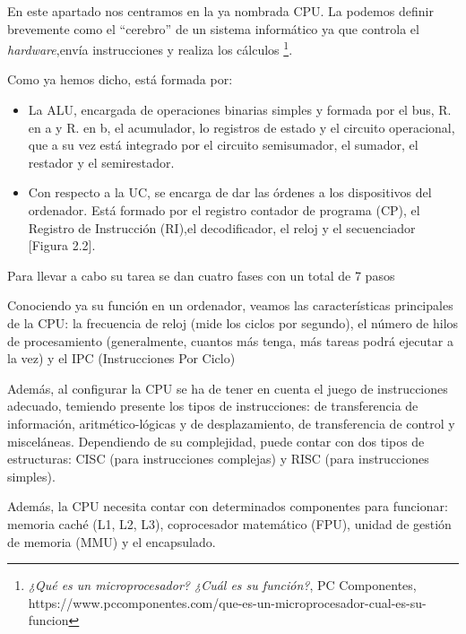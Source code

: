 \documentclass{book}
\begin{document}
\begin{large}

En este apartado nos centramos en la ya nombrada CPU. La podemos definir brevemente como el ``cerebro'' de un sistema informático ya que controla el \textit{hardware},envía instrucciones y realiza los cálculos \footnote {\normalsize \textit{¿Qué es un microprocesador? ¿Cuál es su función?}, PC Componentes, https://www.pccomponentes.com/que-es-un-microprocesador-cual-es-su-funcion}.

Como ya hemos dicho, está formada por: 

\begin{itemize}

    \item La ALU, encargada de operaciones binarias simples y formada por el bus, R. en a y R. en b, el acumulador, lo registros de estado y el circuito operacional, que a su vez está integrado por el circuito semisumador, el sumador, el restador y el semirestador.
    
    \item  Con respecto a la UC, se encarga de dar las órdenes a los dispositivos del ordenador. Está formado por el registro contador de programa (CP), el Registro de Instrucción (RI),el decodificador, el reloj y el secuenciador [Figura 2.2]. 
    

\end{itemize}

Para llevar a cabo su tarea se dan cuatro fases con un total de 7 pasos %

Conociendo ya su función en un ordenador, veamos las características principales de la CPU: la frecuencia de reloj (mide los ciclos por segundo), el número de hilos de procesamiento (generalmente, cuantos más tenga, más tareas podrá ejecutar a la vez) y el IPC (Instrucciones Por Ciclo)

Además, al configurar la CPU se ha de tener en cuenta el juego de instrucciones adecuado, temiendo presente los tipos de instrucciones: de transferencia de información, aritmético-lógicas y de desplazamiento, de transferencia de control y misceláneas. Dependiendo de su complejidad, puede contar con dos tipos de estructuras: CISC (para instrucciones complejas) y RISC (para instrucciones simples).

Además, la CPU necesita contar con determinados componentes para funcionar: memoria caché (L1, L2, L3), coprocesador matemático (FPU), unidad de gestión de memoria (MMU) y el encapsulado.

\end{large}
\end{document}
